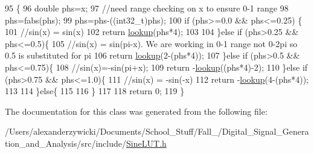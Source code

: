 \begin{DoxyCode}
95                                                           \{
96             \textcolor{keywordtype}{double} phs=x;
97             \textcolor{comment}{//need range checking on x to ensure 0-1 range}
98             phs=fabs(phs);
99             phs=phs-((int32\_t)phs);
100             \textcolor{keywordflow}{if} (phs>=0.0 && phs<=0.25) \{
101                 \textcolor{comment}{//sin(x) = sin(x)}
102                 \textcolor{keywordflow}{return} \hyperlink{class_backend_1_1_small_sine_l_u_t_3_01int32__t_00_01size_01_4_ab58e1db04772d8fad7b5d0f4936454bd}{lookup}(phs*4);
103                 
104             \}\textcolor{keywordflow}{else} \textcolor{keywordflow}{if} (phs>0.25 && phs<=0.5)\{
105                 \textcolor{comment}{//sin(x) =      sin(pi-x). We are working in 0-1 range not 0-2pi so 0.5 is substituted for
       pi}
106                 \textcolor{keywordflow}{return} \hyperlink{class_backend_1_1_small_sine_l_u_t_3_01int32__t_00_01size_01_4_ab58e1db04772d8fad7b5d0f4936454bd}{lookup}(2-(phs*4));
107             \}\textcolor{keywordflow}{else} \textcolor{keywordflow}{if} (phs>0.5 && phs<=0.75)\{
108                 \textcolor{comment}{//sin(x)=-sin(pi+x);}
109                 \textcolor{keywordflow}{return} -\hyperlink{class_backend_1_1_small_sine_l_u_t_3_01int32__t_00_01size_01_4_ab58e1db04772d8fad7b5d0f4936454bd}{lookup}((phs*4)-2);
110             \}\textcolor{keywordflow}{else} \textcolor{keywordflow}{if} (phs>0.75 && phs<=1.0)\{
111                 \textcolor{comment}{//sin(x) = -sin(-x)}
112                 \textcolor{keywordflow}{return} -\hyperlink{class_backend_1_1_small_sine_l_u_t_3_01int32__t_00_01size_01_4_ab58e1db04772d8fad7b5d0f4936454bd}{lookup}(4-(phs*4));
113                 
114             \}\textcolor{keywordflow}{else}\{
115                 
116             \}
117             
118             \textcolor{keywordflow}{return} 0;
119         \}
\end{DoxyCode}


The documentation for this class was generated from the following file\+:\begin{DoxyCompactItemize}
\item 
/\+Users/alexanderzywicki/\+Documents/\+School\+\_\+\+Stuff/\+Fall\+\_/\+Digital\+\_\+\+Signal\+\_\+\+Generation\+\_\+and\+\_\+\+Analysis/src/include/\hyperlink{_sine_l_u_t_8h}{Sine\+L\+U\+T.\+h}\end{DoxyCompactItemize}
